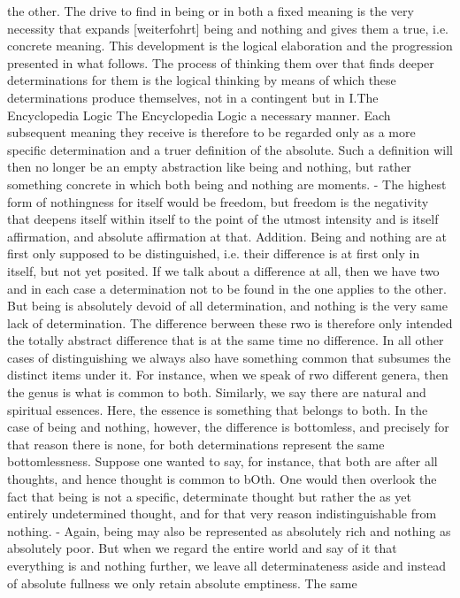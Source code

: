 the other. The drive to find in being or in both a fixed meaning is
the very necessity that expands [weiterfohrt] being and nothing and
gives them a true, i.e. concrete meaning. This development is the
logical elaboration and the progression presented in what follows.
The process of thinking them over that finds deeper determinations
for them is the logical thinking by means of which these
determinations produce themselves, not in a contingent but in
I.The Encyclopedia Logic
The Encyclopedia Logic
a necessary manner. Each subsequent meaning they receive is
therefore to be regarded only as a more specific determination and a
truer definition of the absolute. Such a definition will then no longer
be an empty abstraction like being and nothing, but rather
something concrete in which both being and nothing are
moments. - The highest form of nothingness for itself would be
freedom, but freedom is the negativity that deepens itself within itself
to the point of the utmost intensity and is itself affirmation, and
absolute affirmation at that.
Addition. Being and nothing are at first only supposed to be distinguished,
i.e. their difference is at first only in itself, but not yet posited. If we talk about
a difference at all, then we have two and in each case a determination not to
be found in the one applies to the other. But being is absolutely devoid of all
determination, and nothing is the very same lack of determination. The difference
berween these rwo is therefore only intended the totally abstract difference that
is at the same time no difference. In all other cases of distinguishing we always also
have something common that subsumes the distinct items under it. For instance,
when we speak of rwo different genera, then the genus is what is common to
both. Similarly, we say there are natural and spiritual essences. Here, the essence
is something that belongs to both. In the case of being and nothing, however,
the difference is bottomless, and precisely for that reason there is none, for both
determinations represent the same bottomlessness. Suppose one wanted to say,
for instance, that both are after all thoughts, and hence thought is common to
bOth. One would then overlook the fact that being is not a specific, determinate
thought but rather the as yet entirely undetermined thought, and for that very
reason indistinguishable from nothing. - Again, being may also be represented as
absolutely rich and nothing as absolutely poor. But when we regard the entire world
and say of it that everything is and nothing further, we leave all determinateness
aside and instead of absolute fullness we only retain absolute emptiness. The same
